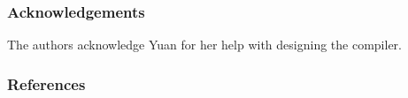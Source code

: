 \documentclass[twoside]{article}
\begin{document}
\subsubsection*{Acknowledgements}

The authors acknowledge Yuan for her help with designing the compiler. 

\subsubsection*{References}


\end{document}
